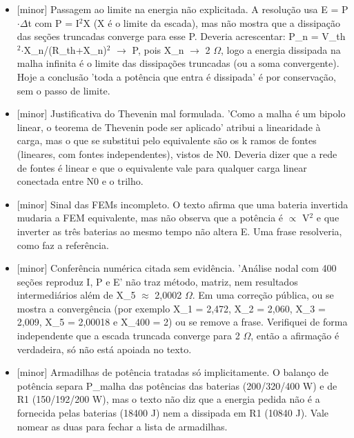 \documentclass{article}%
\begin{document}
\begin{itemize}%
\item%
{[}minor{]} Passagem ao limite na energia não explicitada. A resolução usa E = P$\cdot$$\Delta$t com P = I$^2$X (X é o limite da escada), mas não mostra que a dissipação das seções truncadas converge para esse P. Deveria acrescentar: P\_n = V\_th$^2$$\cdot$X\_n/(R\_th+X\_n)$^2$ $\to$ P, pois X\_n $\to$ 2 $\Omega$, logo a energia dissipada na malha infinita é o limite das dissipações truncadas (ou a soma convergente). Hoje a conclusão 'toda a potência que entra é dissipada' é por conservação, sem o passo de limite.%
\item%
{[}minor{]} Justificativa do Thevenin mal formulada. 'Como a malha é um bipolo linear, o teorema de Thevenin pode ser aplicado' atribui a linearidade à carga, mas o que se substitui pelo equivalente são os k ramos de fontes (lineares, com fontes independentes), vistos de N0. Deveria dizer que a rede de fontes é linear e que o equivalente vale para qualquer carga linear conectada entre N0 e o trilho.%
\item%
{[}minor{]} Sinal das FEMs incompleto. O texto afirma que uma bateria invertida mudaria a FEM equivalente, mas não observa que a potência é $\propto$ V$^2$ e que inverter as três baterias ao mesmo tempo não altera E. Uma frase resolveria, como faz a referência.%
\item%
{[}minor{]} Conferência numérica citada sem evidência. 'Análise nodal com 400 seções reproduz I, P e E' não traz método, matriz, nem resultados intermediários além de X\_5 $\approx$ 2,0002 $\Omega$. Em uma correção pública, ou se mostra a convergência (por exemplo X\_1 = 2,472, X\_2 = 2,060, X\_3 = 2,009, X\_5 = 2,00018 e X\_400 = 2) ou se remove a frase. Verifiquei de forma independente que a escada truncada converge para 2 $\Omega$, então a afirmação é verdadeira, só não está apoiada no texto.%
\item%
{[}minor{]} Armadilhas de potência tratadas só implicitamente. O balanço de potência separa P\_malha das potências das baterias (200/320/400 W) e de R1 (150/192/200 W), mas o texto não diz que a energia pedida não é a fornecida pelas baterias (18400 J) nem a dissipada em R1 (10840 J). Vale nomear as duas para fechar a lista de armadilhas.%
\end{itemize}%
\end{document}
